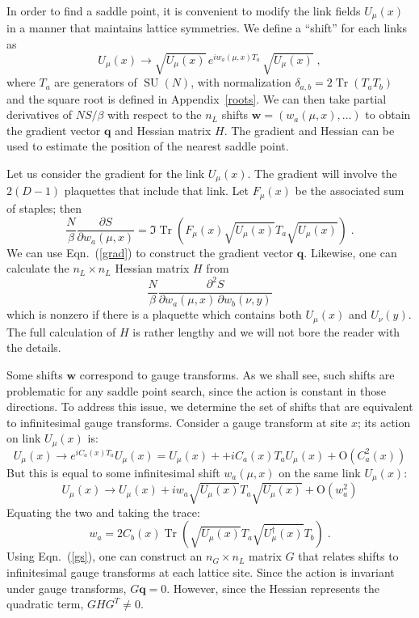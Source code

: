 \documentclass[preprint,aps,prd]{revtex4-2}
\newcommand{\da}{\dagger}  %
\newcommand{\be}{\begin{equation}}
\newcommand{\eq}{\end{equation}}
\DeclareMathOperator{\SU}{SU}
\DeclareMathOperator{\Tr}{Tr}
\begin{document}
In order to find a saddle point, it is convenient to modify
the link fields $U_\mu(x)$ in a manner that maintains lattice symmetries.
We define a ``shift'' for each links as
\be
  U_\mu(x) \to \sqrt{U_\mu(x)}\, e^{i w_{a}(\mu, x) T_a}\, \sqrt{U_\mu(x)} \; ,
    \label{shifts}
\eq
where $T_a$ are generators of $\SU(N)$, with normalization
$\delta_{a,b} = 2 \Tr(T_a T_b)$ and the square root is defined
in Appendix~\ref{roots}.
We can then take partial derivatives of $N S/\beta$ with
respect to the $n_L$ shifts $\mathbf{w} = \left(w_a(\mu, x), \ldots\right)$
to obtain the gradient vector $\mathbf{q}$ and Hessian matrix
$H$.  The gradient and Hessian can be used to estimate the
position of the nearest saddle point.

Let us consider the gradient for the link $U_\mu(x)$.
The gradient will involve the $2 (D-1)$ plaquettes that include that link.
Let $F_\mu(x)$ be the associated sum of staples; then
\be
   \frac{N}{\beta} \frac{\partial S}{\partial w_a(\mu, x)} =
   \Im\Tr\left(F_\mu(x) \sqrt{U_\mu(x)} T_a \sqrt{U_\mu(x)}\right) \; .
   \label{grad}
\eq
We can use Eqn.~(\ref{grad}) to construct the gradient vector $\mathbf{q}$.
Likewise, one can calculate the $n_L\times n_L$ Hessian matrix
$H$ from
\be
      \frac{N}{\beta} \frac{\partial^2 S}{\partial w_a(\mu, x)\, \partial w_b(\nu, y)}
\eq
which is nonzero if there is a plaquette which contains both
$U_\mu(x)$ and $U_\nu(y)$.
The full calculation of $H$ is rather lengthy and we will not bore the reader
with the details.

Some shifts $\mathbf{w}$ correspond to gauge transforms.
As we shall see, such shifts are problematic for any saddle
point search, since the action is constant in those directions.
To address this issue, we determine the set of shifts that are
equivalent to infinitesimal gauge transforms.  Consider a gauge transform
at site $x$; its action on link $U_\mu(x)$ is:
\be
U_\mu(x) \to e^{i C_a(x) T_a} U_\mu(x) = U_\mu(x)+ + i C_a(x) T_a U_\mu(x) +
       \mathrm{O}\!\left(C_a^2(x)\right)
\eq
But this is equal to some infinitesimal shift $w_a(\mu, x)$ on
the same link $U_\mu(x)$:
\be
U_\mu(x) \to U_\mu(x) + i w_a \sqrt{U_\mu(x)}T_a \sqrt{U_\mu(x)} +
       \mathrm{O}\!\left(w_a^2\right)
\eq
%
Equating the two and taking the trace:
\be
w_a = 2 C_b(x) \Tr\left(\sqrt{U_\mu(x)} T_a
                     \sqrt{U_\mu^\da(x)} T_b\right) \; . \label{gs}
\eq
Using Eqn.~(\ref{gs}), one can construct an $n_G \times n_L$ matrix
$G$ that relates shifts to infinitesimal gauge transforms
at each lattice site.
Since the action is invariant under gauge transforms, $G \mathbf{q} = 0$.
However, since the Hessian represents the quadratic term, $G H G^T \neq 0$.
\end{document}
